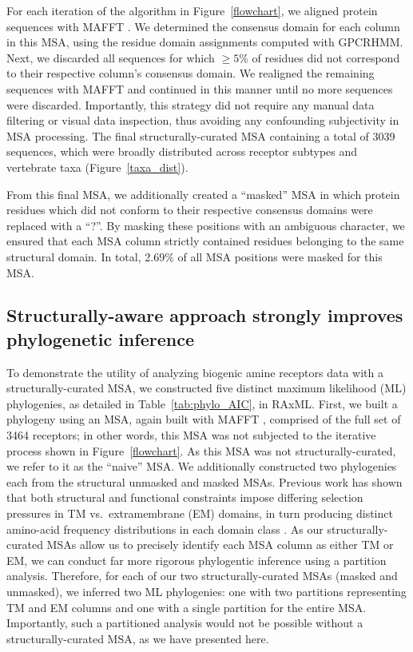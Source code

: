\documentclass[fleqn,10pt]{wlpeerj}
\begin{document}
For each iteration of the algorithm in Figure~\ref{flowchart}, we aligned protein sequences with MAFFT \citep{mafftv7}. We determined the consensus domain for each column in this MSA, using the residue domain assignments computed with GPCRHMM. Next, we discarded all sequences for which $\geq 5\%$ of residues did not correspond to their respective column's consensus domain. We realigned the remaining sequences with MAFFT and continued in this manner until no more sequences were discarded. Importantly, this strategy did not require any manual data filtering or visual data inspection, thus avoiding any confounding subjectivity in MSA processing. The final structurally-curated MSA containing a total of 3039 sequences, which were broadly distributed across receptor subtypes and vertebrate taxa (Figure~\ref{taxa_dist}). 

From this final MSA, we additionally created a ``masked'' MSA in which protein residues which did not conform to their respective consensus domains were replaced with a ``?''. By masking these positions with an ambiguous character, we ensured that each MSA column strictly contained residues belonging to the same structural domain. In total, 2.69\% of all MSA positions were masked for this MSA.


\subsection*{Structurally-aware approach strongly improves phylogenetic inference}

To demonstrate the utility of analyzing biogenic amine receptors data with a structurally-curated MSA, we constructed five distinct maximum likelihood (ML) phylogenies, as detailed in Table~\ref{tab:phylo_AIC}, in RAxML. First, we built a phylogeny using an MSA, again built with MAFFT \citep{mafftv7}, comprised of the full set of 3464 receptors; in other words, this MSA was not subjected to the iterative process shown in Figure~\ref{flowchart}. As this MSA was not structurally-curated, we refer to it as the ``naive'' MSA. We additionally constructed two phylogenies each from the structural unmasked and masked MSAs. Previous work has shown that both structural and functional constraints impose differing selection pressures in TM vs.\ extramembrane (EM) domains, in turn producing distinct amino-acid frequency distributions in each domain class \citep{Tourasse2000,Stevens2001,Julenius2006,Oberai2009,SpielmanWilke2013,FranzosaXueXia2013}. As our structurally-curated MSAs allow us to precisely identify each MSA column as either TM or EM, we can conduct far more rigorous phylogentic inference using a partition analysis. Therefore, for each of our two structurally-curated MSAs (masked and unmasked), we inferred two ML phylogenies: one with two partitions representing TM and EM columns and one with a single partition for the entire MSA. Importantly, such a partitioned analysis would not be possible without a structurally-curated MSA, as we have presented here.
\end{document}
